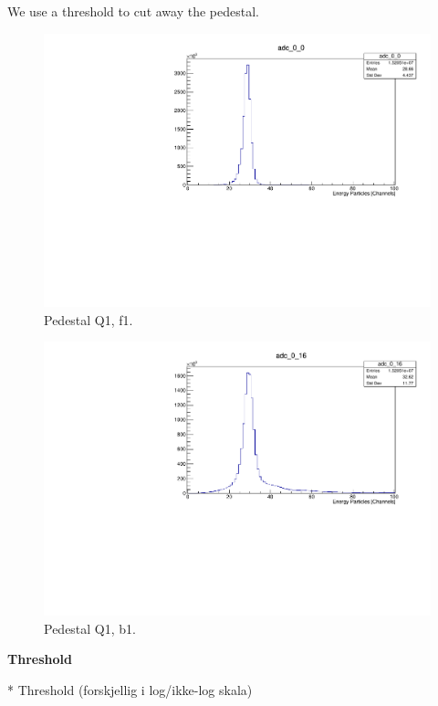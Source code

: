 \documentclass[twoside,english]{uiofysmaster/uiofysmaster}
\begin{document}
We use a threshold to cut away the pedestal.

\begin{figure}[ht]
	\centering
	\includegraphics[width=\textwidth]{../Plots/plotting/Pedestal_Q1_f1.pdf}
	\caption{Pedestal Q1, f1.}
	\label{fig:Pedestal_f}
\end{figure}

\begin{figure}[ht]
	\centering
	\includegraphics[width=\textwidth]{../Plots/plotting/Pedestal_Q1_b1.pdf}
	\caption{Pedestal Q1, b1.}
	\label{fig:Pedestal_b}
\end{figure}



\textbf{Threshold}

* Threshold (forskjellig i log/ikke-log skala)
\end{document}
